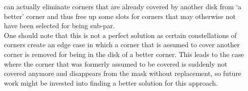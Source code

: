 can actually eliminate corners that are already covered by another disk from `a better' corner and
thus free up some slots for corners that may otherwise not have been selected for being sub-par.\\
One should note that this is not a perfect solution as certain constellations of corners create
an edge case in which a corner that is assumed to cover another corner is removed for being in the
disk of a better corner. This leads to the case where the corner that was formerly assumed to be
covered is suddenly not covered anymore and disappears from the mask without replacement, so future
work might be invested into finding a better solution for this approach.


